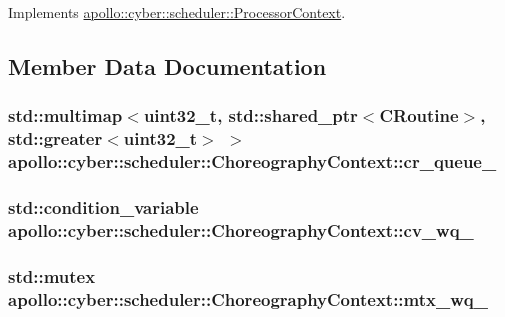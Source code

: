 Implements \hyperlink{classapollo_1_1cyber_1_1scheduler_1_1ProcessorContext_a0a2e1914277be7a5fe81f459c83b6644}{apollo\-::cyber\-::scheduler\-::\-Processor\-Context}.



\subsection{Member Data Documentation}
\hypertarget{classapollo_1_1cyber_1_1scheduler_1_1ChoreographyContext_a9a1cbbf369ba6b3343f48d8b7fe062ad}{
\subsubsection[{cr\-\_\-queue\-\_\-}]{\setlength{\rightskip}{0pt plus 5cm}std\-::multimap$<$uint32\-\_\-t, std\-::shared\-\_\-ptr$<${\bf C\-Routine}$>$, std\-::greater$<$uint32\-\_\-t$>$ $>$ apollo\-::cyber\-::scheduler\-::\-Choreography\-Context\-::cr\-\_\-queue\-\_\-\hspace{0.3cm}{\ttfamily [private]}}}\label{classapollo_1_1cyber_1_1scheduler_1_1ChoreographyContext_a9a1cbbf369ba6b3343f48d8b7fe062ad}
\hypertarget{classapollo_1_1cyber_1_1scheduler_1_1ChoreographyContext_a6089935be7f61f7231d1e0d822562d71}{
\subsubsection[{cv\-\_\-wq\-\_\-}]{\setlength{\rightskip}{0pt plus 5cm}std\-::condition\-\_\-variable apollo\-::cyber\-::scheduler\-::\-Choreography\-Context\-::cv\-\_\-wq\-\_\-\hspace{0.3cm}{\ttfamily [private]}}}\label{classapollo_1_1cyber_1_1scheduler_1_1ChoreographyContext_a6089935be7f61f7231d1e0d822562d71}
\hypertarget{classapollo_1_1cyber_1_1scheduler_1_1ChoreographyContext_a4955bd10541d5f68187f69a5c9c25f2f}{
\subsubsection[{mtx\-\_\-wq\-\_\-}]{\setlength{\rightskip}{0pt plus 5cm}std\-::mutex apollo\-::cyber\-::scheduler\-::\-Choreography\-Context\-::mtx\-\_\-wq\-\_\-\hspace{0.3cm}{\ttfamily [private]}}}\label{classapollo_1_1cyber_1_1scheduler_1_1ChoreographyContext_a4955bd10541d5f68187f69a5c9c25f2f}
